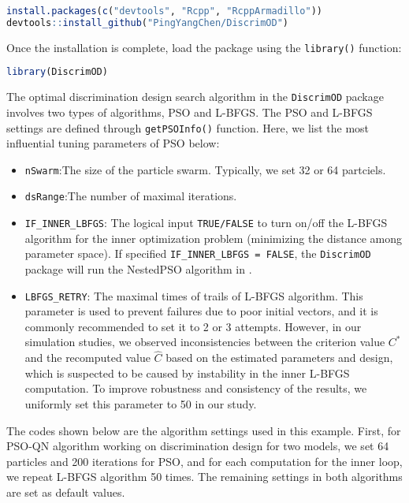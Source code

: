 \begin{lstlisting}[language=R, caption={Installing the DiscrimOD Package}]
install.packages(c("devtools", "Rcpp", "RcppArmadillo"))
devtools::install_github("PingYangChen/DiscrimOD")
\end{lstlisting}

Once the installation is complete, load the package using the \verb|library()| function:

\begin{lstlisting}[language=R, caption={Loading the DiscrimOD Package}]
library(DiscrimOD)
\end{lstlisting}

\hspace*{8mm} The optimal discrimination design search algorithm in the \verb|DiscrimOD| package involves two types of algorithms, PSO and L-BFGS. The PSO and L-BFGS settings are defined through \verb|getPSOInfo()| function. Here, we list the most influential tuning parameters of PSO below:

\begin{itemize}
\item \verb|nSwarm|:The size of the particle swarm. Typically, we set 32 or 64 partciels.

\item \verb|dsRange|:The number of maximal iterations.

\item \verb|IF_INNER_LBFGS|: The logical input \verb|TRUE/FALSE| to turn on/off the L-BFGS algorithm for the inner optimization problem (minimizing the distance among parameter space). If specified \verb|IF_INNER_LBFGS = FALSE|, the \verb|DiscrimOD| package will run the NestedPSO algorithm in \cite{chen2015minimax}.

\item \verb|LBFGS_RETRY|: The maximal times of trails of L-BFGS algorithm. This parameter is used to prevent failures due to poor initial vectors, and it is commonly recommended to set it to 2 or 3 attempts. However, in our simulation studies, we observed inconsistencies between the criterion value $C^*$ and the recomputed value $\hat{C}$ based on the estimated parameters and design, which is suspected to be caused by instability in the inner L-BFGS computation. To improve robustness and consistency of the results, we uniformly set this parameter to 50 in our study.

\end{itemize}

The codes shown below are the algorithm settings used in this example. First, for PSO-QN algorithm working on discrimination design for two models, we set 64 particles and 200 iterations for PSO, and for each computation for the inner loop, we repeat L-BFGS algorithm 50 times. The remaining settings in both algorithms are set as default values.

